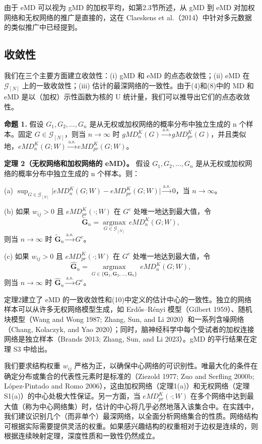 \documentclass[
  10
]{article}
\begin{document}
由于 eMD 可以视为 gMD 的加权平均，如第2.3节所述，从 gMD 到 eMD 对加权网络和无权网络的推广是直接的，这在 Claeskens et al.（2014）中针对多元数据的类似推广中已经提到。

\subsection{收敛性}

我们在三个主要方面建立收敛性：(i) gMD 和 eMD 的点态收敛性；(ii) eMD 在 $\mathcal{G}_{[N]}$ 上的一致收敛性；(iii) 估计的最深网络的一致性。由于(4)和(8)中的 MD 和 eMD 是以（加权）示性函数为核的 U 统计量，我们可以推导出它们的点态收敛性。

\textbf{命题 1.} 假设 $G_1,G_2,\dots,G_n$ 是从无权或加权网络的概率分布中独立生成的 n 个样本。固定 $G\in\mathcal{G}_{[N]}$，则当 $n\to\infty$ 时 $gMD_n^K(G)\xrightarrow{\mathrm{a.s.}} gMD_{pr}^K(G)$，并且类似地，$eMD_n^K(G;W)\xrightarrow{\mathrm{a.s.}} eMD_{pr}^K(G;W)$。

\textbf{定理 2（无权网络和加权网络的 eMD）。} 假设 $G_1,G_2,\dots,G_n$ 是从无权或加权网络的概率分布中独立生成的 n 个样本。则：

(a) $\sup_{G\in\mathcal{G}_{[N]}} \bigl| eMD_n^K(G;W) - eMD_{pr}^K(G;W) \bigr| \xrightarrow{\mathrm{a.s.}} 0$，当 $n\to\infty$。

(b) 如果 $w_{ij}>0$ 且 $eMD_{pr}^K(\cdot;W)$ 在 $G^c$ 处唯一地达到最大值，令
$$
\widetilde{\mathbf{G}}_n = \operatorname*{argmax}_{G\in\mathcal{G}_{[N]}} \, eMD_n^K(G;W),
$$
则当 $n\to\infty$ 时 $\widetilde{\mathbf{G}}_n \xrightarrow{\mathrm{a.s.}} G^c$。

(c) 如果 $w_{ij}>0$ 且 $eMD_{pr}^K(\cdot;W)$ 在 $G^c$ 处唯一地达到最大值，令
$$
\widehat{\mathbf{G}}_n = \operatorname*{argmax}_{G\in\{\mathbf{G}_1,\mathbf{G}_2,\dots,\mathbf{G}_n\}} \, eMD_n^K(G;W),
$$
则当 $n\to\infty$ 时 $\widehat{\mathbf{G}}_n \xrightarrow{\mathrm{a.s.}} G^c$。

定理2建立了 eMD 的一致收敛性和(10)中定义的估计中心的一致性。独立的网络样本可以从许多无权网络模型生成，如 Erdős–Rényi 模型（Gilbert 1959）、随机块模型（Wang and Wong 1987; Zhang, Sun, and Li 2020）和一系列含噪网络（Chang, Kolaczyk, and Yao 2020）；同时，脑神经科学中每个受试者的加权连接网络是独立样本（Brands 2013; Zhang, Sun, and Li 2023）。gMD 的平行结果在定理 S3 中给出。

我们要求结构权重 $w_{ij}$ 严格为正，以确保中心网络的可识别性。唯最大化的条件在确定分布或集合的代表性元素时是标准的（Ziezold 1977; Zuo and Serfling 2000b; López-Pintado and Romo 2006），这由加权网络（定理1(a)）和无权网络（定理 S1(a)）的中心处极大性保证。另一方面，当 $eMD_{pr}^K(\cdot;W)$ 在多个网络中达到最大值（称为中心网络集）时，估计的中心将几乎必然地落入该集合中。在实践中，我们建议识别几个（而非单个）最深网络，以全面分析网络集合的性质。网络结构可根据实际需要提供灵活的权重。如果感兴趣结构的权重相对于边权是连续的，则根据连续映射定理，深度性质和一致性仍然成立。
\end{document}
